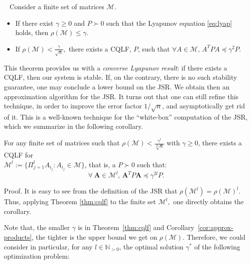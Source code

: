 \begin{thm}\label{thm:cqlf} 
 \ \newline 
Consider a finite set of matrices $\mathcal{M}$.
\vspace{-0.2cm}
\begin{itemize} 
\item If there exist $\gamma \geq 0$ and $P \succ 0$ such that the Lyapunov equation \eqref{eq:lyap} holds, then $\rho(\mathcal{M}) \leq \gamma$.
\vspace{0.2cm}
\item If $\rho(\mathcal{M}) < \frac{\gamma}{\sqrt{n}},$ there exists a CQLF, $P$, such that $\forall A \in \mathcal{M},\, A^T P A \preceq \gamma^2 P.$
\end{itemize}
\end{thm}
This theorem provides us with a \emph{converse Lyapunov result}: if there exists a CQLF, then our system is stable. If, on the contrary, there is no such stability guarantee, one may conclude a lower bound on the JSR. We obtain then an approximation algorithm for the JSR. It turns out that one can still refine this technique, in order to improve the error factor $1/\sqrt{n}$, and asymptotically get rid of it. This is a well-known technique for the ``white-box'' computation of the JSR, which we summarize in the following corollary.
\begin{cor}\label{cor:approx-products}
For any finite set of matrices such that $\rho(\mathcal{M}) < \frac{\gamma^l}{\sqrt[2l]{n}}$ with $\gamma \geq 0$, there exists a CQLF for \\
$\mathcal{M}^l:=\{\Pi_{j=1}^l A_{i_j}: A_{i_j} \in \mathcal{M}\}$, that is, a $P\succ 0$ such that:$$\forall\ \mathbf{A} \in \mathcal{M}^l,\, \mathbf{A}^T P \mathbf{A} \preceq \gamma^{2l} P.$$
\end{cor}
\vspace{-0.8cm}
\begin{pf*}{Proof.}
It is easy to see from the definition of the JSR that $\rho(\mathcal{M}^l)=\rho(\mathcal{M})^l$. Thus, applying Theorem \ref{thm:cqlf} to the finite set $\mathcal{M}^l,$ one directly obtains the corollary.
\end{pf*}
\vspace{-0.5cm}
Note that, the smaller $\gamma$ is in Theorem~\ref{thm:cqlf} and Corollary~\ref{cor:approx-products}, the tighter is the upper bound we get on $\rho(\mathcal{M})$. Therefore, we could consider in particular, for any $l \in \mathbb{N}_{>0}$, the optimal solution $\gamma^*$ of the following optimization problem:
